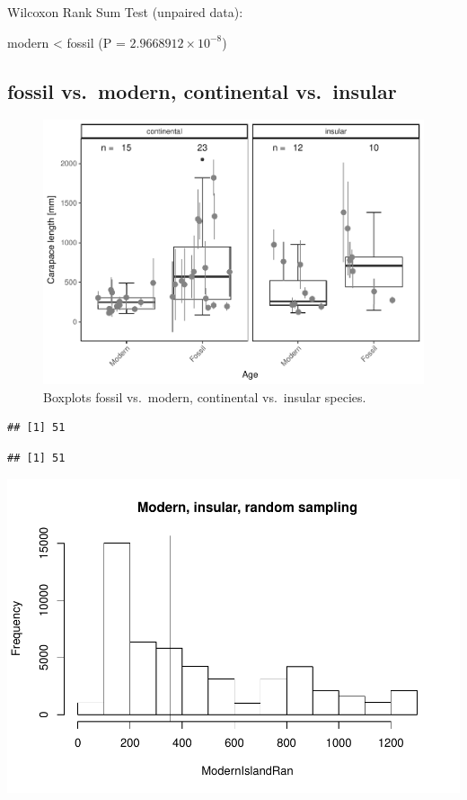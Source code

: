 \documentclass[]{article}
\begin{document}
Wilcoxon Rank Sum Test (unpaired data):

modern \textless{} fossil (P = \(2.9668912\times 10^{-8}\))

\newpage

\subsection{fossil vs.~modern, continental
vs.~insular}\label{fossil-vs.modern-continental-vs.insular}

\begin{figure}[htbp]
\centering
\includegraphics{MA_JJ_files/figure-latex/BPFMCI-1.pdf}
\caption{Boxplots fossil vs.~modern, continental vs.~insular species.}
\end{figure}

\begin{verbatim}
## [1] 51
\end{verbatim}

\begin{verbatim}
## [1] 51
\end{verbatim}

\includegraphics{MA_JJ_files/figure-latex/RSMFCI-1.pdf}
\end{document}
